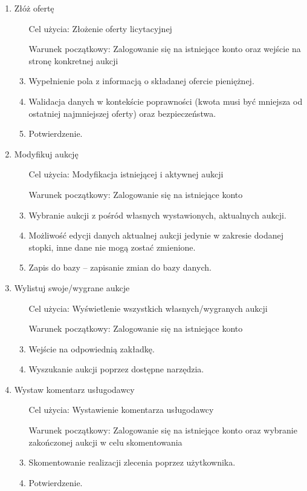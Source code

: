 \documentclass[10pt,titlepage]{article} %
\begin{document}
\begin{enumerate}[1.]
\item Złóż ofertę
\begin{enumerate}
\item[Cel użycia:] Złożenie oferty licytacyjnej
\item[Warunek początkowy:] Zalogowanie się na istniejące konto oraz wejście na stronę konkretnej aukcji
\item Wypełnienie pola z informacją o składanej ofercie pieniężnej.
\item Walidacja danych w kontekście poprawności (kwota musi być mniejsza od ostatniej najmniejszej oferty) oraz bezpieczeństwa.
\item Potwierdzenie.
\end{enumerate}

\item Modyfikuj aukcję
\begin{enumerate}
\item[Cel użycia:] Modyfikacja istniejącej i aktywnej aukcji
\item[Warunek początkowy:] Zalogowanie się na istniejące konto
\item Wybranie aukcji z pośród własnych wystawionych, aktualnych aukcji.
\item Możliwość edycji danych aktualnej aukcji jedynie w zakresie dodanej stopki, inne dane nie mogą zostać zmienione.
\item Zapis do bazy – zapisanie zmian do bazy danych.
\end{enumerate}

\item Wylistuj swoje/wygrane aukcje
\begin{enumerate}
\item[Cel użycia:] Wyświetlenie wszystkich własnych/wygranych aukcji
\item[Warunek początkowy:] Zalogowanie się na istniejące konto 
\item Wejście na odpowiednią zakładkę.
\item Wyszukanie aukcji poprzez dostępne narzędzia.
\end{enumerate}

\item Wystaw komentarz usługodawcy
\begin{enumerate}
\item[Cel użycia:] Wystawienie komentarza usługodawcy
\item[Warunek początkowy:] Zalogowanie się na istniejące konto oraz wybranie zakończonej aukcji w celu skomentowania
\item Skomentowanie realizacji zlecenia poprzez użytkownika.
\item Potwierdzenie.
\end{enumerate}


\end{enumerate}
\end{document}
